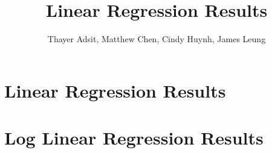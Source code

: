 \documentclass[12pt]{article}
\begin{document}
\title{Linear Regression Results}

\author{Thayer Adsit, Matthew Chen, Cindy Huynh, James Leung}

\maketitle

\section{Linear Regression Results}







\section{Log Linear Regression Results}






\end{document}
